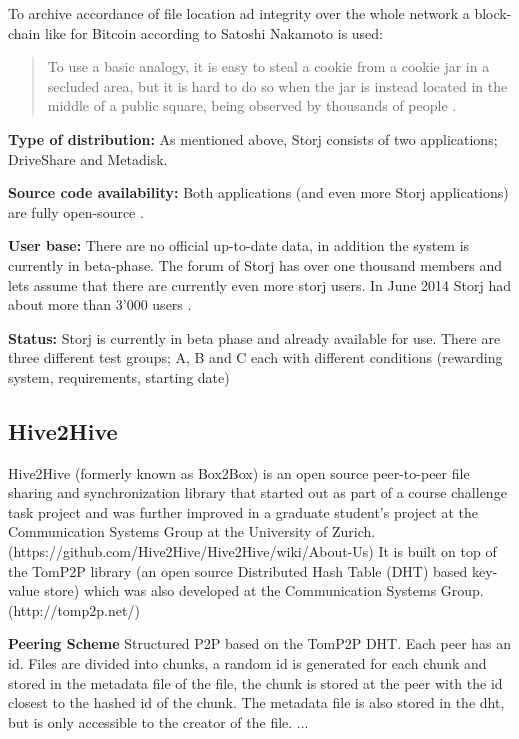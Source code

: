 To archive accordance of file location ad integrity over the whole network a block-chain like for Bitcoin according to Satoshi Nakamoto \cite{bitcoin} is used:

\begin{quotation}To use a basic analogy, it is easy to steal a cookie from a cookie jar in a secluded area, but it is hard to do so when the jar is instead located in the middle of a public square, being observed by thousands of people \cite{storj:PDF}.\end{quotation}

\textbf{Type of distribution:} As mentioned above, Storj consists of two applications; DriveShare and Metadisk.

\textbf{Source code availability:} Both applications (and even more Storj applications) are fully open-source \cite{storj:github}.

\textbf{User base:} There are no official up-to-date data, in addition the system is currently in beta-phase. The forum of Storj has over one thousand members \cite{storj:forum} and lets assume that there are currently even more storj users. In June 2014 Storj had about more than 3'000 users \cite{storj:crowdsale}.

\textbf{Status:} Storj is currently in beta phase and already available for use. There are three different test groups; A, B and C each with different conditions (rewarding system, requirements, starting date) \cite {storj:earlyaccess}

\subsection{Hive2Hive} %
Hive2Hive (formerly known as Box2Box) is an open source peer-to-peer file sharing and synchronization library that started out as part of a course challenge task project and was further improved in a graduate student's project at the Communication Systems Group at the University of Zurich. (https://github.com/Hive2Hive/Hive2Hive/wiki/About-Us) It is built on top of the TomP2P library (an open source Distributed Hash Table (DHT) based key-value store) which was also developed at the Communication Systems Group. (http://tomp2p.net/)

\textbf{Peering Scheme}
Structured P2P based on the TomP2P DHT. Each peer has an id. Files are divided into chunks, a random id is generated for each chunk and stored in the metadata file of the file, the chunk is stored at the peer with the id closest to the hashed id of the chunk. The metadata file is also stored in the dht, but is only accessible to the creator of the file. ...

